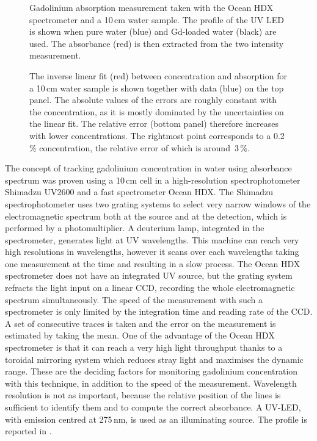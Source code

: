 \begin{figure}
	\centering
	\resizebox{0.7\linewidth}{!}{}
	\caption[Ocean HDX spectra with a 10\,cm water sample]%
		{Gadolinium absorption measurement taken with the Ocean HDX spectrometer and a 10\,cm water sample.
		The profile of the UV LED is shown when pure water (blue) and Gd-loaded water (black) are used.
		The absorbance (red) is then extracted from the two intensity measurement.}
	\label{fig:uv_led}
\end{figure}
\begin{figure}
	\centering
	\resizebox{0.8\textwidth}{!}{}
	\caption[Linear fit between Gd concentration and absorption with a 10\,cm water sample]%
		{The inverse linear fit (red) between concentration and absorption for a 10\,cm water sample %
		is shown together with data (blue) on the top panel.
		The absolute values of the errors are roughly constant with the concentration, %
		as it is mostly dominated by the uncertainties on the linear fit.
		The relative error (bottom panel) therefore increases with lower concentrations.
		The rightmost point corresponds to a 0.2\,\% concentration, the relative error %
		of which is around~3\,\%.}
	\label{fig:gad_10cm}
\end{figure}

The concept of tracking gadolinium concentration in water using absorbance spectrum %
was proven using a 10\,cm cell in a high-resolution spectrophotometer Shimadzu UV2600 %
and a fast spectrometer Ocean HDX.
The Shimadzu spectrophotometer uses two grating systems to select very narrow windows of the electromagnetic spectrum %
both at the source and at the detection, which is performed by a photomultiplier.
A deuterium lamp, integrated in the spectrometer, generates light at UV wavelengths.
This machine can reach very high resolutions in wavelengths, however it scans over each wavelengths %
taking one measurement at the time and resulting in a slow process.
The Ocean HDX spectrometer does not have an integrated UV source, %
but the grating system refracts the light input on a linear CCD, recording the whole %
electromagnetic spectrum simultaneously.
The speed of the measurement with such a spectrometer is only limited by the integration time %
and reading rate of the CCD.
A set of consecutive traces is taken and the error on the measurement is estimated by taking the mean.
One of the advantage of the Ocean HDX spectrometer is that it can reach a very high light throughput %
thanks to a toroidal mirroring system which reduces stray light and maximises the dynamic range.
These are the deciding factors for monitoring gadolinium concentration with this technique, %
in addition to the speed of the measurement.
Wavelength resolution is not as important, because the relative position of the lines is sufficient %
to identify them and to compute the correct absorbance.
A UV-LED, with emission centred at 275\,nm, is used as an illuminating source.
The profile is reported in .

